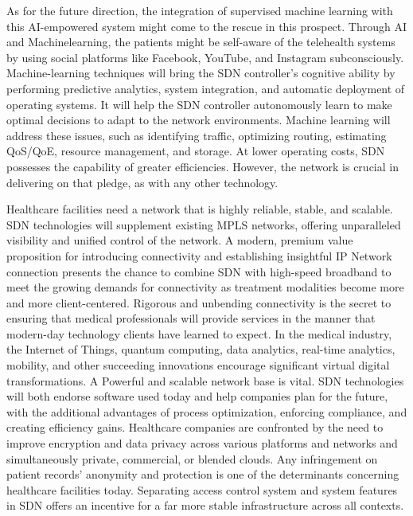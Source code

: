 \documentclass[10pt]{article}
\begin{document}
As for the future direction, the integration of supervised machine learning with this AI-empowered system might come to the rescue in this prospect. Through AI and Machinelearning, the patients might be self-aware of the telehealth systems by using social platforms like Facebook, YouTube, and Instagram subconsciously. Machine-learning techniques will bring the SDN controller's cognitive ability by performing predictive analytics, system integration, and automatic deployment of operating systems. It will help the SDN controller autonomously learn to make optimal decisions to adapt to the network environments. Machine learning will address these issues, such as identifying traffic, optimizing routing, estimating QoS/QoE, resource management, and storage. At lower operating costs, SDN possesses the capability of greater efficiencies. However, the network is crucial in delivering on that pledge, as with any other technology.

Healthcare facilities need a network that is highly reliable, stable, and scalable. SDN technologies will supplement existing MPLS networks, offering unparalleled visibility and unified control of the network. A modern, premium value proposition for introducing connectivity and establishing insightful IP Network connection presents the chance to combine SDN with high-speed broadband to meet the growing demands for connectivity as treatment modalities become more and more client-centered. Rigorous and unbending connectivity is the secret to ensuring that medical professionals will provide services in the manner that modern-day technology clients have learned to expect. In the medical industry, the Internet of Things, quantum computing, data analytics, real-time analytics, mobility, and other succeeding innovations encourage significant virtual digital transformations. A Powerful and scalable network base is vital. SDN technologies will both endorse software used today and help companies plan for the future, with the additional advantages of process optimization, enforcing compliance, and creating efficiency gains. Healthcare companies are confronted by the need to improve encryption and data privacy across various platforms and networks and simultaneously private, commercial, or blended clouds. Any infringement on patient records' anonymity and protection is one of the determinants concerning healthcare facilities today. Separating access control system and system features in SDN offers an incentive for a far more stable infrastructure across all contexts.
\end{document}
